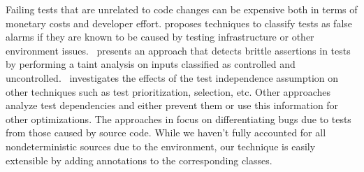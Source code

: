 Failing tests that are unrelated to code changes can be expensive both in terms of monetary costs and
developer effort. \cite{Herzig:2015:EDF:2819009.2819018} proposes techniques to classify tests as false alarms
if they are known to be caused by testing infrastructure or other environment issues.~\cite{Huo:2014:IOQ:2635868.2635917}
presents an approach that detects brittle assertions in tests by performing a taint analysis on inputs classified as 
controlled and uncontrolled.~\cite{ZhangJWMLEN2014} investigates the
effects of the test independence assumption
on other techniques such as test prioritization, selection, etc. Other approaches~\cite{BellKMD2015,Gyori:2015:RTD:2771783.2771793}
analyze test dependencies and either prevent them or use this information for other optimizations.
The approaches in \cite{Dan:2013:10.1007/978-3-642-39038-8_25,Vahabzadeh:2015:7332456} focus on differentiating bugs due to tests
from those caused by source code. While we haven't fully accounted for all nondeterministic sources due
to the environment, our technique is easily extensible by adding annotations to the corresponding classes.


